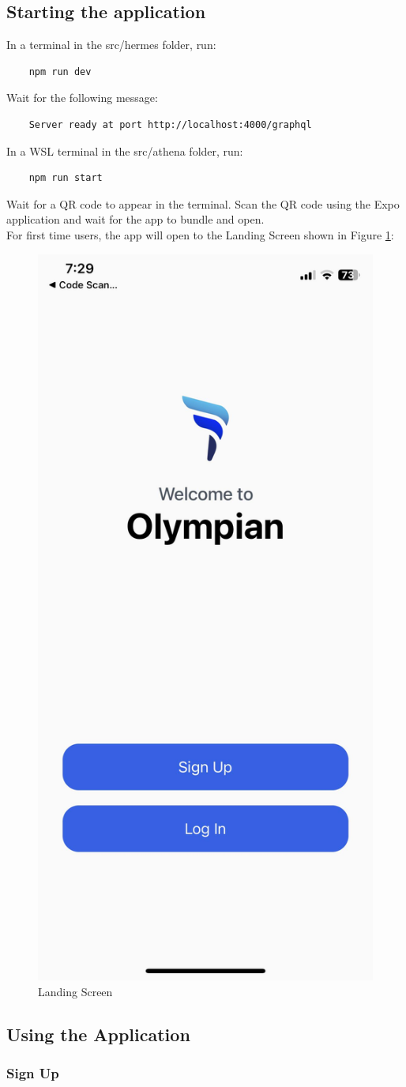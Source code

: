 \documentclass{article}
\begin{document}
\subsection{Starting the application}

In a terminal in the src/hermes folder, run:
    \begin{verbatim}
    npm run dev
    \end{verbatim}

Wait for the following message:
    \begin{verbatim}
    Server ready at port http://localhost:4000/graphql
    \end{verbatim}

In a WSL terminal in the src/athena folder, run:
    \begin{verbatim}
    npm run start
    \end{verbatim}

Wait for a QR code to appear in the terminal. Scan the QR code using the Expo application and wait for the app to bundle and open.\\
For first time users, the app will open to the Landing Screen shown in Figure \ref{FigLanding}:
\begin{figure}[H]
    \centering
    \includegraphics[height=0.6\textwidth]{imgs/Landing.jpg}
    \caption{Landing Screen}
    \label{FigLanding}
    \end{figure}


\subsection{Using the Application}

\subsubsection{Sign Up}
\end{document}
